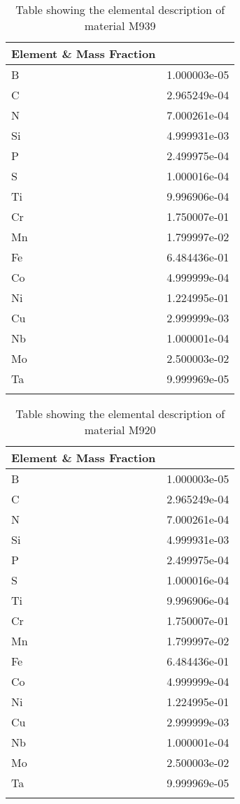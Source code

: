\begin{centering}
\begin{longtable}[ht!]
{ p{} | p{} }
\hline
Element \& Mass Fraction\\
\hline
B &  1.000003e-05\\
C &  2.965249e-04\\
N &  7.000261e-04\\
Si &  4.999931e-03\\
P &  2.499975e-04\\
S &  1.000016e-04\\
Ti &  9.996906e-04\\
Cr &  1.750007e-01\\
Mn &  1.799997e-02\\
Fe &  6.484436e-01\\
Co &  4.999999e-04\\
Ni &  1.224995e-01\\
Cu &  2.999999e-03\\
Nb &  1.000001e-04\\
Mo &  2.500003e-02\\
Ta &  9.999969e-05\\
\caption{Table showing the elemental description of material M939}
\label{table:material_EppWaterPipes}
\end{longtable}
\clearpage

\begin{longtable}[ht!]
{ p{} | p{} }
\hline
Element \& Mass Fraction\\
\hline
B &  1.000003e-05\\
C &  2.965249e-04\\
N &  7.000261e-04\\
Si &  4.999931e-03\\
P &  2.499975e-04\\
S &  1.000016e-04\\
Ti &  9.996906e-04\\
Cr &  1.750007e-01\\
Mn &  1.799997e-02\\
Fe &  6.484436e-01\\
Co &  4.999999e-04\\
Ni &  1.224995e-01\\
Cu &  2.999999e-03\\
Nb &  1.000001e-04\\
Mo &  2.500003e-02\\
Ta &  9.999969e-05\\
\caption{Table showing the elemental description of material M920}
\label{table:material_EppDIagBox}
\end{longtable}
\clearpage


\end{centering}
